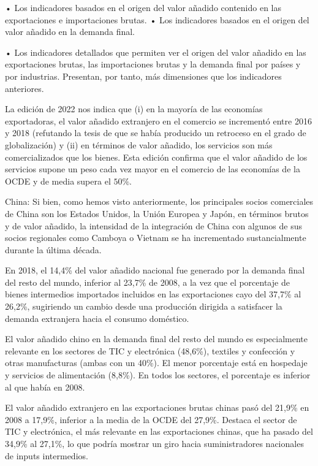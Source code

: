 \documentclass[10pt,a4paper]{article}
\begin{document}
{• Los indicadores basados en el origen del valor añadido contenido en las exportaciones e importaciones brutas. • Los indicadores basados en el origen del valor añadido en la demanda final. 

• Los indicadores detallados que permiten ver el origen del valor añadido en las exportaciones brutas, las importaciones brutas y la demanda final por países y por industrias. Presentan, por tanto, más dimensiones que los indicadores anteriores.

La edición de 2022 nos indica que (i) en la mayoría de las economías exportadoras, el valor añadido extranjero en el comercio se incrementó entre 2016 y 2018 (refutando la tesis de que se había producido un retroceso en el grado de globalización) y (ii) en términos de valor añadido, los servicios son más comercializados que los bienes. Esta edición confirma que el valor añadido de los servicios supone un peso cada vez mayor en el comercio de las economías de la OCDE y de media supera el $50\%$.

China: Si bien, como hemos visto anteriormente, los principales socios comerciales de China son los Estados Unidos, la Unión Europea y Japón, en términos brutos y de valor añadido, la intensidad de la integración de China con algunos de sus socios regionales como Camboya o Vietnam se ha incrementado sustancialmente durante la última década.

En 2018, el 14,4\% del valor añadido nacional fue generado por la demanda final del resto del mundo, inferior al 23,7\% de 2008, a la vez que el porcentaje de bienes intermedios importados incluidos en las exportaciones cayo del 37,7\% al 26,2\%, sugiriendo un cambio desde una producción dirigida a satisfacer la demanda extranjera hacia el consumo doméstico.

El valor añadido chino en la demanda final del resto del mundo es especialmente relevante en los sectores de TIC y electrónica (48,6\%), textiles y confección y otras manufacturas (ambas con un 40\%). El menor porcentaje está en hospedaje y servicios de alimentación (8,8\%). En todos los sectores, el porcentaje es inferior al que había en 2008.

El valor añadido extranjero en las exportaciones brutas chinas pasó del 21,9\% en 2008 a 17,9\%, inferior a la media de la OCDE del 27,9\%. Destaca el sector de TIC y electrónica, el más relevante en las exportaciones chinas, que ha pasado del 34,9\% al 27,1\%, lo que podría mostrar un giro hacia suministradores nacionales de inputs intermedios.

}
\end{document}
